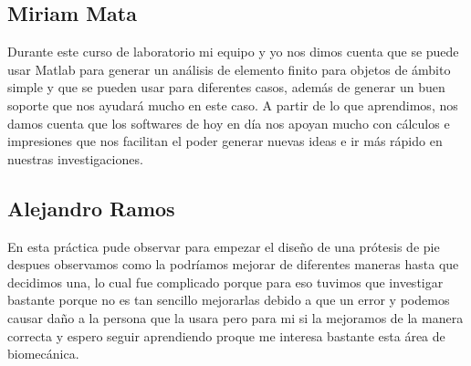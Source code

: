 \documentclass{article}
\begin{document}
\subsection{Miriam  Mata}
Durante este curso de laboratorio mi equipo y yo nos dimos cuenta que se puede usar Matlab para generar un análisis de elemento finito para objetos de ámbito simple y que se pueden usar para diferentes casos, además de generar un buen soporte que nos ayudará mucho en este caso. A partir de lo que aprendimos, nos damos cuenta que los softwares de hoy en día nos apoyan mucho con cálculos e impresiones que nos facilitan el poder generar nuevas ideas e ir más rápido en nuestras investigaciones.
\subsection{Alejandro Ramos}
En esta práctica pude observar para empezar el diseño de una prótesis de pie despues observamos como la podríamos mejorar
de diferentes maneras hasta que decidimos una, lo cual fue complicado porque para eso tuvimos que investigar bastante 
porque no es tan sencillo mejorarlas debido a que un error y podemos causar daño a la persona que la usara
pero para mi si la mejoramos de la manera correcta y espero seguir aprendiendo proque me interesa bastante
esta área de biomecánica.


\end{document}
